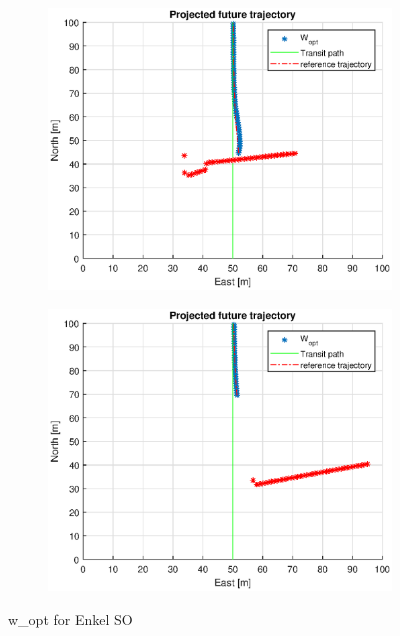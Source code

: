 \begin{figure}
\begin{subfigure}[b]{0.499\textwidth}
    \end{subfigure}
    \hfill
    \\
    \begin{subfigure}[b]{0.49\textwidth}
        \centering
        \includegraphics[width=\textwidth]{Images/Figures/Enkel_SO/Simple0_f999_Frame3}
    \end{subfigure}
    \hfill
    \begin{subfigure}[b]{0.499\textwidth}
        \centering
        \includegraphics[width=\textwidth]{Images/Figures/Enkel_SO/Simple0_f999_Frame4}
    \end{subfigure}
    \hfill
    \caption{w\_opt for Enkel SO}
\end{figure}


